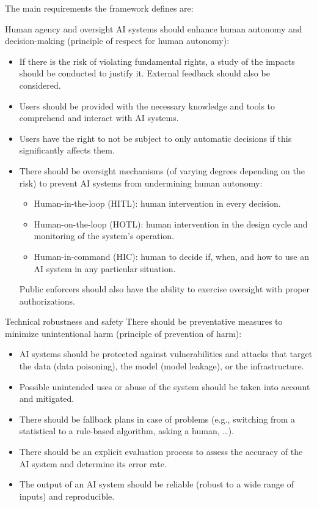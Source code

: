 The main requirements the framework defines are:
\begin{descriptionlist}
    \item[Human agency and oversight] 
        AI systems should enhance human autonomy and decision-making (principle of respect for human autonomy):
        \begin{itemize}
            \item If there is the risk of violating fundamental rights, a study of the impacts should be conducted to justify it. External feedback should also be considered.
            \item Users should be provided with the necessary knowledge and tools to comprehend and interact with AI systems. 
            \item Users have the right to not be subject to only automatic decisions if this significantly affects them.
            \item There should be oversight mechanisms (of varying degrees depending on the risk) to prevent AI systems from undermining human autonomy:
            \begin{itemize}
                \item Human-in-the-loop (HITL): human intervention in every decision.
                \item Human-on-the-loop (HOTL): human intervention in the design cycle and monitoring of the system's operation.
                \item Human-in-command (HIC): human to decide if, when, and how to use an AI system in any particular situation.
            \end{itemize}
            Public enforcers should also have the ability to exercise oversight with proper authorizations.
        \end{itemize}

    \item[Technical robustness and safety] 
        There should be preventative measures to minimize unintentional harm (principle of prevention of harm):
        \begin{itemize}
            \item AI systems should be protected against vulnerabilities and attacks that target the data (data poisoning), the model (model leakage), or the infrastructure.
            \item Possible unintended uses or abuse of the system should be taken into account and mitigated.
            \item There should be fallback plans in case of problems (e.g., switching from a statistical to a rule-based algorithm, asking a human, \dots).
            \item There should be an explicit evaluation process to assess the accuracy of the AI system and determine its error rate.
            \item The output of an AI system should be reliable (robust to a wide range of inputs) and reproducible.
        \end{itemize}


\end{descriptionlist}
